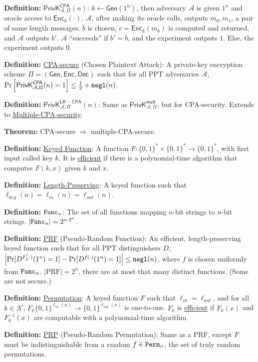 \documentclass[12pt]{article}
\newcommand{\AAA}{\mathcal{A}}
\newcommand{\KKK}{\mathcal{K}}
\newcommand{\defn}[1]{{\bf Definition:} \underline{#1}}
\newcommand{\thm}[1]{{\bf Theorem:} \underline{#1}}
\newcommand{\Enc}{\mathsf{Enc}}
\newcommand{\Dec}{\mathsf{Dec}}
\newcommand{\Gen}{\mathsf{Gen}}
\newcommand{\GenEncDec}{(\Gen,\Enc,\Dec)}
\newcommand{\ExptMultArgs}[2]{\mathsf{PrivK}^{\mathsf{mult}}_{#1,#2}}
\newcommand{\ExptCpaArgs}[2]{\mathsf{PrivK}^{\mathsf{CPA}}_{#1,#2}}
\newcommand{\ExptLrCpa}{\mathsf{PrivK}^{\mathsf{LR-CPA}}_{\AAA,\Pi}}
\newcommand{\ExptMult}{\ExptMultArgs{\AAA}{\Pi}}
\newcommand{\ExptCpa}{\ExptCpaArgs{\AAA}{\Pi}}
\newcommand{\negl}{{\tt negl}}
\newcommand{\from}{\leftarrow}
\begin{document}
\begin{multicols}{3}

\defn{$\ExptCpa(n)$}: $k\from\Gen(1^n)$, then adversary $\AAA$ is given $1^n$ and oracle access to $\Enc_k(\cdot)$. $\AAA$, after making its oracle calls, outputs $m_0,m_1$, a pair of same length messages. $b$ is chosen, $c=\Enc_k(m_b)$ is computed and returned, and $\AAA$ outputs $b'$. $\AAA$ ``succeeds'' if $b'=b$, and the experiment outputs $1$. Else, the experiment outputs $0$.

\defn{CPA-secure} (Chosen Plaintext Attack): A private-key encryption scheme $\Pi=\GenEncDec$ such that for all PPT adversaries $\AAA$, $\Pr\left[\ExptCpa(n)=1\right]\leq\frac{1}{2}+\negl(n)$.

\defn{$\ExptLrCpa(n)$}: Same as $\ExptMult$, but for CPA-security. Extends to \underline{Multiple-CPA-security}.

\thm{}CPA-secure $\Rightarrow$ multiple-CPA-secure.

\defn{Keyed Function}: A function $F:\{0,1\}^*\times\{0,1\}^*\to\{0,1\}^*$, with first input called key $k$. It is \underline{efficient} if there is a polynomial-time algorithm that computes $F(k,x)$ given $k$ and $x$.

\defn{Length-Preserving}: A keyed function such that $\ell_{key}(n)=\ell_{in}(n)=\ell_{out}(n)$.

\defn{${\tt Func}_n$}: The set of all functions mapping $n$-bit strings to $n$-bit strings. $|{\tt Func}_n|=2^{n\cdot2^n}$.

\defn{PRF} (Pseudo-Random Function): An efficient, length-preserving keyed function such that for all PPT distinguishers $D$, $\left|\Pr[D^{F_k^(\cdot)}(1^n)=1]-\Pr[D^{f(\cdot)}(1^n)=1]\right|\leq\negl(n)$, where $f$ is chosen uniformly from ${\tt Func}_n$. $|\text{PRF}|=2^n$, there are at most that many distinct functions. (Some are not secure.)

\defn{Permutation}: A keyed function $F$ such that $\ell_{in}=\ell_{out}$, and for all $k\in\KKK$, $F_k\{0,1\}^{\ell_{in}(n)}\to\{0,1\}^{\ell_{out}(n)}$ is one-to-one. $F_k$ is \underline{efficient} if $F_k(x)$ and $F_k^{-1}(x)$ are computable with a polynomial-time algorithm.

\defn{PRP} (Pseudo-Random Permutation): Same as a PRF, except $F$ must be indistinguishable from a random $f\in{\tt Perm}_n$, the set of truly random permutations.


\end{multicols}
\end{document}

